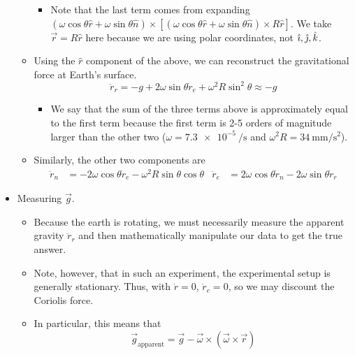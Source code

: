 \documentclass[../notes.tex]{subfiles}
\begin{document}
\begin{itemize}
\begin{itemize}
\begin{equation*}
        \end{equation*}
        \begin{itemize}
            \item Note that the last term comes from expanding $(\omega\cos\theta\hat{r}+\omega\sin\theta\hat{n})\times[(\omega\cos\theta\hat{r}+\omega\sin\theta\hat{n})\times R\hat{r}]$. We take $\vec{r}=R\hat{r}$ here because we are using polar coordinates, not $\hat{\imath},\hat{\jmath},\hat{k}$.
        \end{itemize}
        \item Using the $\hat{r}$ component of the above, we can reconstruct the gravitational force at Earth's surface.
        \begin{equation*}
            \ddot{r}_r = -g+2\omega\sin\theta\dot{r}_e+\omega^2R\sin^2\theta
            \approx -g
        \end{equation*}
        \begin{itemize}
            \item We say that the sum of the three terms above is approximately equal to the first term because the first term is 2-5 orders of magnitude larger than the other two ($\omega=\SI{7.3e-5}{\per\second}$ and $\omega^2R=\SI[per-mode=symbol]{34}{\milli\meter\per\second\squared}$).
        \end{itemize}
        \item Similarly, the other two components are
        \begin{align*}
            \ddot{r}_n &= -2\omega\cos\theta\dot{r}_e-\omega^2R\sin\theta\cos\theta&
            \ddot{r}_e &= 2\omega\cos\theta\dot{r}_n-2\omega\sin\theta\dot{r}_r
        \end{align*}
    \end{itemize}
    \item Measuring $\vec{g}$.
    \begin{itemize}
        \item Because the earth is rotating, we must necessarily measure the apparent gravity $\ddot{r}_r$ and then mathematically manipulate our data to get the true answer.
        \item Note, however, that in such an experiment, the experimental setup is generally stationary. Thus, with $\dot{r}=0$, $\dot{r}_e=0$, so we may discount the Coriolis force.
        \item In particular, this means that
        \begin{equation*}
            \vec{g}_\text{apparent} = \vec{g}-\vec{\omega}\times(\vec{\omega}\times\vec{r})

\end{equation*}
\end{itemize}
\end{itemize}
\end{document}
